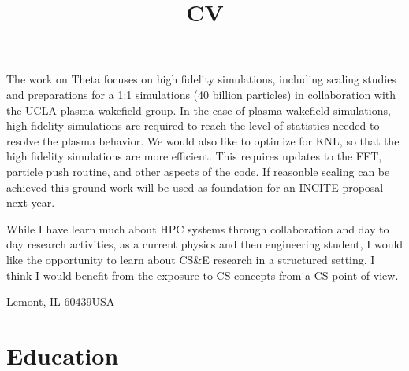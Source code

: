\documentclass[11pt,a4paper,sans]{moderncv}        %
\begin{document}
The work on Theta focuses on high fidelity simulations, 
including scaling studies and preparations for a 1:1 simulations
 (40 billion particles) in collaboration with the UCLA plasma wakefield group. 
 In the case of plasma wakefield simulations, high fidelity simulations are 
 required to reach the level of statistics needed to resolve the plasma behavior.
 We would also like to optimize for KNL, so that the high fidelity simulations
 are more efficient. This requires updates to the FFT, particle push routine, and
 other aspects of the code. If reasonble scaling can be achieved this 
 ground work will be used as foundation for an INCITE proposal next year.
 
 While I have learn much about HPC systems through collaboration and 
 day to day research activities, as a current physics and then engineering student, 
 I would like the opportunity to learn about CS\&E research in a structured setting.
 I think I would benefit from the exposure to CS concepts from a CS point of view.


\makeletterclosing


\clearpage

\title{CV}                               %
\address{9700 Cass Avenue}{Lemont, IL 60439}{USA}%
\makecvtitle

\section{Education}

\iffalse
\section{Ph.D Thesis}
\cvitem{Title}{\emph{Design for Staged Two Beam Acceleration at the Argonne Wakefield Accelerator}}
\cvitem{Advisors}{Linda Spentzouris, John Power}
\cvitem{Summary}{
	Staged two beam acceleration using dielectric structures has yet to 
	be achieved anywhere in the world. In this thesis, I discuss beam 
	line design, simulation, and optimization, of a 
	beam line with the potential for dielectric two beam acceleration.
    Preliminary and prepratory experimental measurements
    are included.    }
\fi
\end{document}
